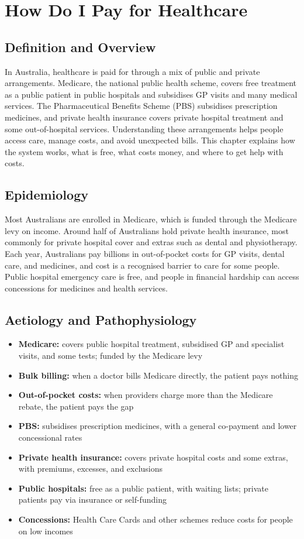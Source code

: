 \chapter{How Do I Pay for Healthcare}

\section*{Definition and Overview}
In Australia, healthcare is paid for through a mix of public and private arrangements. Medicare, the national public health scheme, covers free treatment as a public patient in public hospitals and subsidises GP visits and many medical services. The Pharmaceutical Benefits Scheme (PBS) subsidises prescription medicines, and private health insurance covers private hospital treatment and some out-of-hospital services. Understanding these arrangements helps people access care, manage costs, and avoid unexpected bills. This chapter explains how the system works, what is free, what costs money, and where to get help with costs.

\section*{Epidemiology}
Most Australians are enrolled in Medicare, which is funded through the Medicare levy on income. Around half of Australians hold private health insurance, most commonly for private hospital cover and extras such as dental and physiotherapy. Each year, Australians pay billions in out-of-pocket costs for GP visits, dental care, and medicines, and cost is a recognised barrier to care for some people. Public hospital emergency care is free, and people in financial hardship can access concessions for medicines and health services.

\section*{Aetiology and Pathophysiology}
\begin{itemize}
    \item \textbf{Medicare:} covers public hospital treatment, subsidised GP and specialist visits, and some tests; funded by the Medicare levy
    \item \textbf{Bulk billing:} when a doctor bills Medicare directly, the patient pays nothing
    \item \textbf{Out-of-pocket costs:} when providers charge more than the Medicare rebate, the patient pays the gap
    \item \textbf{PBS:} subsidises prescription medicines, with a general co-payment and lower concessional rates
    \item \textbf{Private health insurance:} covers private hospital costs and some extras, with premiums, excesses, and exclusions
    \item \textbf{Public hospitals:} free as a public patient, with waiting lists; private patients pay via insurance or self-funding
    \item \textbf{Concessions:} Health Care Cards and other schemes reduce costs for people on low incomes
\end{itemize}

